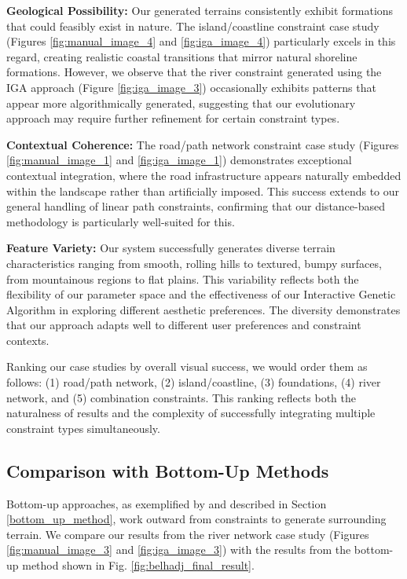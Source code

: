 \textbf{Geological Possibility:} Our generated terrains consistently exhibit formations that could feasibly exist in nature. The island/coastline constraint case study (Figures \ref{fig:manual_image_4} and \ref{fig:iga_image_4}) particularly excels in this regard, creating realistic coastal transitions that mirror natural shoreline formations. However, we observe that the river constraint generated using the IGA approach (Figure \ref{fig:iga_image_3}) occasionally exhibits patterns that appear more algorithmically generated, suggesting that our evolutionary approach may require further refinement for certain constraint types.

\textbf{Contextual Coherence:} The road/path network constraint case study (Figures \ref{fig:manual_image_1} and \ref{fig:iga_image_1}) demonstrates exceptional contextual integration, where the road infrastructure appears naturally embedded within the landscape rather than artificially imposed. This success extends to our general handling of linear path constraints, confirming that our distance-based methodology is particularly well-suited for this.

\textbf{Feature Variety:} Our system successfully generates diverse terrain characteristics ranging from smooth, rolling hills to textured, bumpy surfaces, from mountainous regions to flat plains. This variability reflects both the flexibility of our parameter space and the effectiveness of our Interactive Genetic Algorithm in exploring different aesthetic preferences. The diversity demonstrates that our approach adapts well to different user preferences and constraint contexts.

Ranking our case studies by overall visual success, we would order them as follows: (1) road/path network, (2) island/coastline, (3) foundations, (4) river network, and (5) combination constraints. This ranking reflects both the naturalness of results and the complexity of successfully integrating multiple constraint types simultaneously.

\subsection{Comparison with Bottom-Up Methods}

Bottom-up approaches, as exemplified by \cite{Belhadj07} and described in Section \ref{bottom_up_method}, work outward from constraints to generate surrounding terrain. We compare our results from the river network case study (Figures \ref{fig:manual_image_3} and \ref{fig:iga_image_3}) with the results from the bottom-up method shown in Fig. \ref{fig:belhadj_final_result}.

